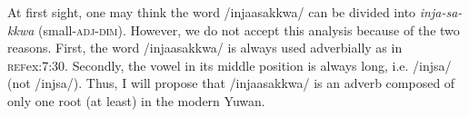 \z

At first sight, one may think the word /injaasakkwa/ can be divided into \textit{inja-sa-kkwa} (small-\textsc{adj}-\textsc{dim}). However, we do not accept this analysis because of the two reasons. First, the word /injaasakkwa/ is always used adverbially as in \textsc{ref}{ex:7:30}. Secondly, the vowel in its middle position is always long, i.e. /injsa/ (not /injsa/). Thus, I will propose that /injaasakkwa/ is an adverb composed of only one root (at least) in the modern Yuwan.
